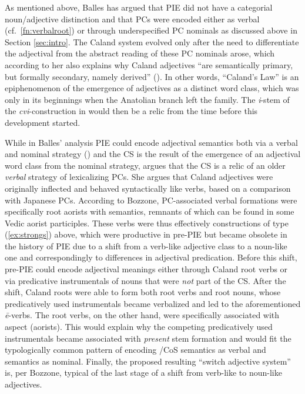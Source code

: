 \documentclass[output=paper,colorlinks,citecolor=brown]{langscibook}
\begin{document}
As mentioned above, Balles \citeyearpar{Balles2006, Balles2009} has argued that PIE did not have a categorial  noun/adjective distinction and that PCs were encoded either as verbal (cf.\ \ref{fn:verbalroot}) or through underspecified PC nominals as discussed above in Section \ref{sec:intro}. The Caland system  evolved only after the need to differentiate the adjectival from the abstract reading of these PC nominals arose, which according to her  also explains why Caland adjectives ``are semantically primary,  but formally secondary, namely derived'' (\citealt[10--11]{Balles2009}). In other words, ``Caland's Law''  is an epiphenomenon of the emergence of adjectives as a distinct word class, which was only in its beginnings when the Anatolian branch left the family. The \textit{i}-stem of the \textit{cvi}-construction in  would then be a relic from the time before this development started. 

While in Balles' analysis PIE could encode adjectival semantics both via a verbal and nominal strategy (\citeyear[271]{Balles2006}) and the CS   is the result of the emergence of an adjectival word class from the nominal strategy, \citet{Bozzone2016} argues that the CS is a relic of an older \emph{verbal} strategy of lexicalizing  PCs. She argues that Caland adjectives   were originally inflected and behaved syntactically like verbs, based on a comparison with Japanese PCs. According to Bozzone, PC-associated verbal formations were specifically root aorists with  semantics, remnants of which can be found in some Vedic aorist participles. These verbs were thus effectively constructions of type (\ref{ex:strongs}) above, which were productive in pre-PIE but became obsolete in the history of PIE due to a shift from a verb-like adjective class to a noun-like one and correspondingly to differences in adjectival predication. Before this shift, pre-PIE could encode adjectival meanings either through Caland root verbs or via predicative instrumentals of nouns that were \emph{not} part of the CS. After the shift, Caland roots were able to form both root verbs and root nouns, whose predicatively used instrumentals became verbalized and led to the aforementioned  \textit{ē}-verbs. The root verbs, on the other hand, were specifically associated with  aspect (aorists). This would explain why the competing predicatively used instrumentals became associated with \emph{present} stem formation and would fit the typologically common pattern of encoding /CoS  semantics as verbal and  semantics as nominal. Finally, the proposed resulting ``switch adjective system'' is, per Bozzone, typical of the last stage of a shift from verb-like to noun-like adjectives. 
\end{document}
